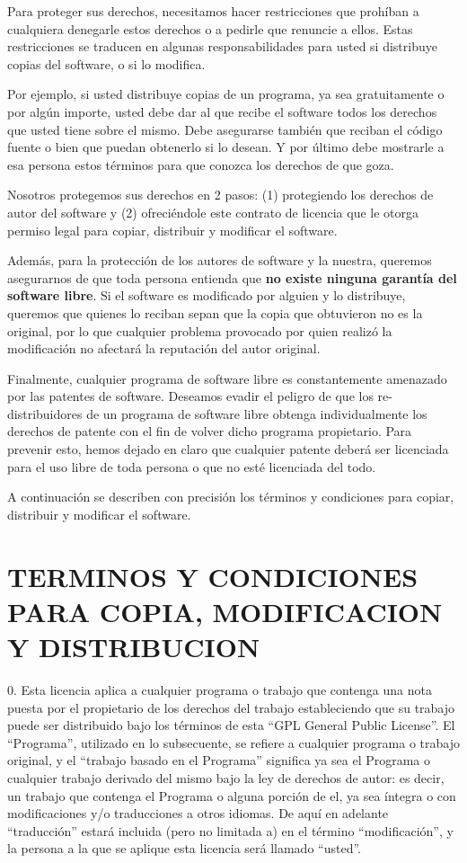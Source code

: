 Para proteger sus derechos, necesitamos hacer restricciones que prohíban a cualquiera denegarle estos derechos o a pedirle que renuncie a ellos. Estas restricciones se traducen en algunas responsabilidades para usted si distribuye copias del software, o si lo modifica. 

Por ejemplo, si usted distribuye copias de un programa, ya sea gratuitamente o por algún importe, usted debe dar al que recibe el software todos los derechos que usted tiene sobre el mismo. Debe asegurarse también que reciban el código fuente o bien que puedan obtenerlo si lo desean. Y por último debe mostrarle a esa persona estos términos para que conozca los derechos de que goza. 

Nosotros protegemos sus derechos en 2 pasos: (1) protegiendo los derechos de autor del software y (2) ofreciéndole este contrato de licencia que le otorga permiso legal para copiar, distribuir y modificar el software. 

Además, para la protección de los autores de software y la nuestra, queremos asegurarnos de que toda persona entienda que \textbf{no existe ninguna garantía del software libre}. Si el software es modificado por alguien y lo distribuye, queremos que quienes lo reciban sepan que la copia que obtuvieron no es la original, por lo que cualquier problema provocado por quien realizó la modificación no afectará la reputación del autor original. 

Finalmente, cualquier programa de software libre es constantemente amenazado por las patentes de software. Deseamos evadir el peligro de que los re-distribuidores de un programa de software libre obtenga individualmente los derechos de patente con el fin de volver dicho programa propietario. Para prevenir esto, hemos dejado en claro que cualquier patente deberá ser licenciada para el uso libre de toda persona o que no esté licenciada del todo. 

A continuación se describen con precisión los términos y condiciones para copiar, distribuir y modificar el software. 

\section{TERMINOS Y CONDICIONES PARA COPIA, MODIFICACION Y DISTRIBUCION }


0. Esta licencia aplica a cualquier programa o trabajo que contenga una nota puesta por el propietario de los derechos del trabajo estableciendo que su trabajo puede ser distribuido bajo los términos de esta “GPL General Public License”. El “Programa”, utilizado en lo subsecuente, se refiere a cualquier programa o trabajo original, y el “trabajo basado en el Programa” significa ya sea el Programa o cualquier trabajo derivado del mismo bajo la ley de derechos de autor: es decir, un trabajo que contenga el Programa o alguna porción de el, ya sea íntegra o con modificaciones y/o traducciones a otros idiomas. De aquí en adelante “traducción” estará incluida (pero no limitada a) en el término “modificación”, y la persona a la que se aplique esta licencia será llamado “usted”. 

